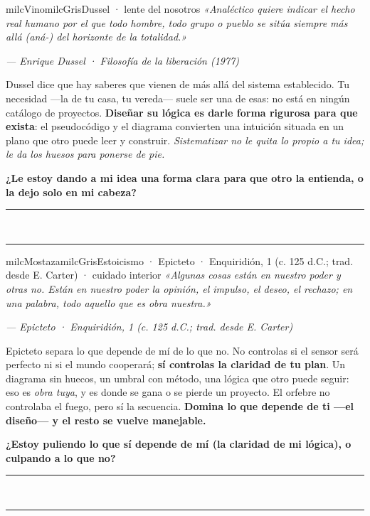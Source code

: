 \documentclass[11pt,letterpaper]{article}
\newcommand{\linead}[1]{\noindent\color{milcLinea}\rule{#1}{0.5pt}\color{milcNegro}}
\begin{document}
\begin{softbox}{milcVino}{milcGris}{Dussel · lente del nosotros}
\textit{«Analéctico quiere indicar el hecho real humano por el que todo hombre, todo grupo o pueblo se sitúa siempre más allá (aná-) del horizonte de la totalidad.»}

{\footnotesize\itshape\color{milcNegro!70}--- Enrique Dussel · Filosofía de la liberación (1977)}

Dussel dice que hay saberes que vienen de más allá del sistema establecido. Tu necesidad ---la de tu casa, tu vereda--- suele ser una de esas: no está en ningún catálogo de proyectos. \textbf{Diseñar su lógica es darle forma rigurosa para que exista}: el pseudocódigo y el diagrama convierten una intuición situada en un plano que otro puede leer y construir. \emph{Sistematizar no le quita lo propio a tu idea; le da los huesos para ponerse de pie.}

\textbf{¿Le estoy dando a mi idea una forma clara para que otro la entienda, o la dejo solo en mi cabeza?}
\end{softbox}
\linead{\linewidth}\\[1mm]
\linead{\linewidth}

\begin{softbox}{milcMostaza}{milcGris}{Estoicismo · Epicteto · Enquiridión, 1 (c. 125 d.C.; trad. desde E. Carter) · cuidado interior}
\textit{«Algunas cosas están en nuestro poder y otras no. Están en nuestro poder la opinión, el impulso, el deseo, el rechazo; en una palabra, todo aquello que es obra nuestra.»}

{\footnotesize\itshape\color{milcNegro!70}--- Epicteto · Enquiridión, 1 (c. 125 d.C.; trad. desde E. Carter)}

Epicteto separa lo que depende de mí de lo que no. No controlas si el sensor será perfecto ni si el mundo cooperará; \textbf{sí controlas la claridad de tu plan}. Un diagrama sin huecos, un umbral con método, una lógica que otro puede seguir: eso es \emph{obra tuya}, y es donde se gana o se pierde un proyecto. El orfebre no controlaba el fuego, pero sí la secuencia. \textbf{Domina lo que depende de ti ---el diseño--- y el resto se vuelve manejable.}

\textbf{¿Estoy puliendo lo que sí depende de mí (la claridad de mi lógica), o culpando a lo que no?}
\end{softbox}
\linead{\linewidth}\\[1mm]
\linead{\linewidth}
\end{document}
